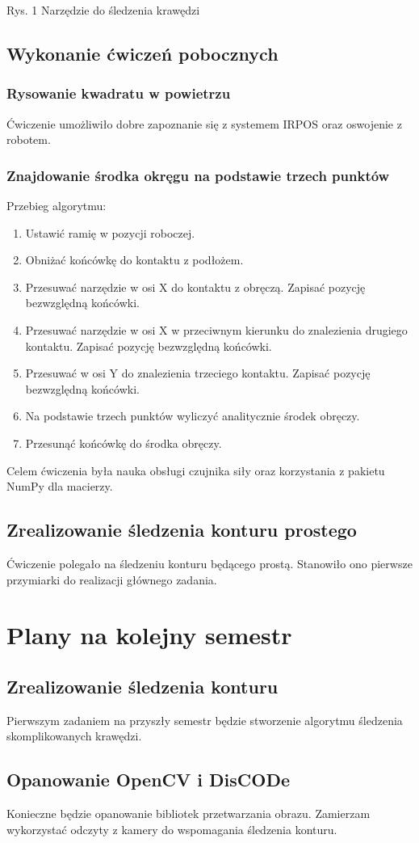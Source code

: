 \documentclass[12pt, a4paper, twoside]{book}
\begin{document}
	\caption{Rys. 1 Narzędzie do śledzenia krawędzi}
	
	\section{Wykonanie ćwiczeń pobocznych}
		\subsection{Rysowanie kwadratu w powietrzu}
		Ćwiczenie umożliwiło dobre zapoznanie się z systemem IRPOS oraz oswojenie z robotem.
		\subsection{Znajdowanie środka okręgu na podstawie trzech punktów}
		Przebieg algorytmu:
			\begin{enumerate}
			\item Ustawić ramię w pozycji roboczej.
			\item Obniżać końcówkę do kontaktu z podłożem.
			\item Przesuwać narzędzie w osi X do kontaktu z obręczą. Zapisać pozycję bezwzględną końcówki.
			\item Przesuwać narzędzie w osi X w przeciwnym kierunku do znalezienia drugiego kontaktu. Zapisać pozycję bezwzględną końcówki.
			\item Przesuwać w osi Y do znalezienia trzeciego kontaktu. Zapisać pozycję bezwzględną końcówki.
			\item Na podstawie trzech punktów wyliczyć analitycznie środek obręczy.
			\item Przesunąć końcówkę do środka obręczy. 
			\end{enumerate}
		Celem ćwiczenia była nauka obsługi czujnika siły oraz korzystania z pakietu NumPy dla macierzy.
	\section{Zrealizowanie śledzenia konturu prostego}
		Ćwiczenie polegało na śledzeniu konturu będącego prostą. Stanowiło ono pierwsze przymiarki do realizacji głównego zadania.
			
\chapter{Plany na kolejny semestr}
	\section{Zrealizowanie śledzenia konturu}
	Pierwszym zadaniem na przyszły semestr będzie stworzenie algorytmu śledzenia skomplikowanych krawędzi.
	\section{Opanowanie OpenCV i DisCODe}
	Konieczne będzie opanowanie bibliotek przetwarzania obrazu. Zamierzam wykorzystać odczyty z kamery do wspomagania śledzenia konturu.
\end{document}
